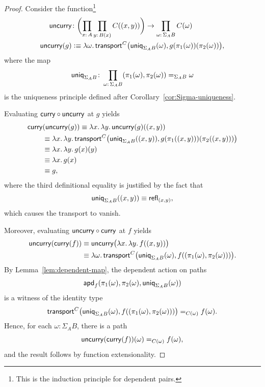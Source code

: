\begin{proof}
    Consider the function\footnote{This is the induction principle for dependent pairs.}
    \begin{align*}
        \fun{uncurry}
            &\colon
                \biggl(
                    \prod_{x\colon A}\prod_{y\colon B(x)}C((x,y))
                \biggr)
            \to\prod_{\omega\colon\Sigma_AB}C(\omega)\\
            \fun{uncurry}(g)
                &\defeq\lambda\omega.\,\fun{transport}^C
                    \bigl(
                        \fun{uniq}_{\Sigma_AB}(\omega),
                        g(\pi_1(\omega))(\pi_2(\omega))
                    \bigr),
    \end{align*}
    where the map
    \begin{align*}
        \fun{uniq}_{\Sigma_AB}\colon\prod_{\omega\colon\Sigma_AB}(\pi_1(\omega),\pi_2(\omega))\eq{\Sigma_AB}\omega
    \end{align*}
    is the uniqueness principle defined after Corollary~\ref{cor:Sigma-uniqueness}.

    Evaluating\/ $\mathsf{curry}\circ\mathsf{uncurry}$ at\/ $g$ yields
    \begin{align*}
        \mathsf{curry}&(\mathsf{uncurry}(g))
            \equiv\lambda x.\,\lambda y.\,\mathsf{uncurry}(g)((x,y))\\
            &\equiv\lambda x.\,\lambda y.\,\mathsf{transport}^C\bigl(\mathsf{uniq}_{\Sigma_AB}((x,y)),g(\pi_1((x,y)))(\pi_2((x,y)))\bigr)\\
            &\equiv\lambda x.\,\lambda y.\,g(x)(y)\\
            &\equiv\lambda x.\,g(x)\\
            &\equiv g,
    \end{align*}
    where the third definitional equality is justified by the fact that
    \[
        \mathsf{uniq}_{\Sigma_AB}((x,y))\equiv\mathsf{refl}_{(x,y)},
    \]
    which causes the transport to vanish.

    Moreover, evaluating\/ $\mathsf{uncurry}\circ\mathsf{curry}$ at\/ $f$ yields
    \begin{align*}
        \mathsf{uncurry}(\mathsf{curry}(f))
            &\equiv\mathsf{uncurry}\bigl(\lambda x.\,\lambda y.\,f((x,y))\bigr)\\
            &\equiv\lambda\omega.\,\mathsf{transport}^C\bigl(\mathsf{uniq}_{\Sigma_AB}(\omega),f((\pi_1(\omega),\pi_2(\omega)))\bigr).
    \end{align*}
    By Lemma~\ref{lem:dependent-map}, the dependent action on paths
    \[
        \mathsf{apd}_f
            (
                \pi_1(\omega),\pi_2(\omega),
                \mathsf{uniq}_{\Sigma_AB}(\omega)
            )
    \]
    is a witness of the identity type
    \[
        \mathsf{transport}^C\bigl(\mathsf{uniq}_{\Sigma_AB}(\omega),f((\pi_1(\omega),\pi_2(\omega)))\bigr)\mathrel{=_{C(\omega)}}f(\omega).
    \]
    Hence, for each\/ $\omega\colon\Sigma_AB$, there is a path
    \[
        \mathsf{uncurry}(\mathsf{curry}(f))(\omega)\mathrel{=_{C(\omega)}}f(\omega),
    \]
    and the result follows by function extensionality.
\end{proof}

